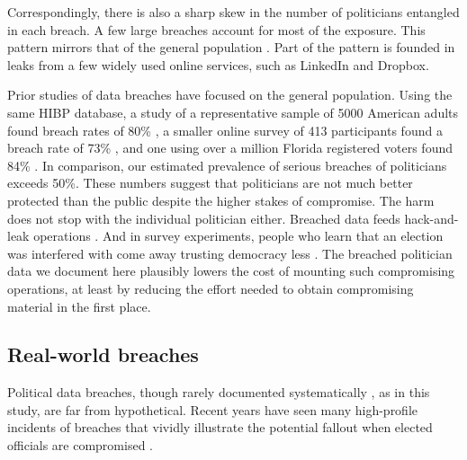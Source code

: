 \documentclass[12pt, letterpaper]{article}
\begin{document}
Correspondingly, there is also a sharp skew in the number of politicians entangled in each breach. A few large breaches account for most of the exposure. This pattern mirrors that of the general population \citep{sood2019pwned}. Part of the pattern is founded in leaks from a few widely used online services, such as LinkedIn and Dropbox.

Prior studies of data breaches have focused on the general population. Using the same HIBP database, a study of a representative sample of 5000 American adults found breach rates of 80\% \citep{sood2019pwned}, a smaller online survey of 413 participants found a breach rate of 73\% \citep{mayer2021angry}, and one using over a million Florida registered voters found 84\% \citep{Sood_Have_I_Been_2023}. In comparison, our estimated prevalence of serious breaches of politicians exceeds 50\%. These numbers suggest that politicians are not much better protected than the public despite the higher stakes of compromise.
The harm does not stop with the individual politician either.
Breached data feeds hack-and-leak operations \citep{shires2019}.
And in survey experiments, people who learn that an election was interfered with come away trusting democracy less \citep{tomz2020}.
The breached politician data we document here plausibly lowers the cost of mounting such compromising operations, at least by reducing the effort needed to obtain compromising material in the first place.



\subsection{Real-world breaches}
Political data breaches, though rarely documented systematically \citep{dunncavelty2020}, as in this study, are far from hypothetical.
Recent years have seen many high-profile incidents of breaches that vividly illustrate the potential fallout when elected officials are compromised \citep{dnc2016hack_guardian, dnc2016hack_crowdstrike, macron2017hack, uk2017breach, germany2019, norway2020, finland2020, twitterhack2020, twitterhackwitman2022}.
\end{document}
